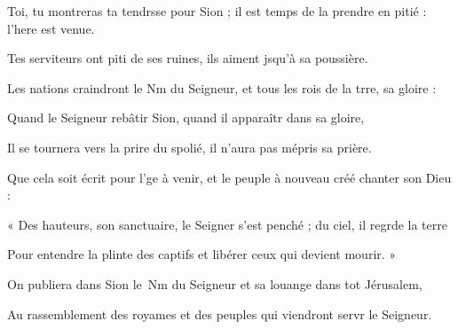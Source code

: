 \item Toi, tu montreras ta tendrsse pour Sion ;\psstar{} il est temps de la prendre en pitié : l’here est venue.
\item Tes serviteurs ont piti de ses ruines,\psstar{} ils aiment jsqu’à sa poussière.
\item Les nations craindront le Nm du Seigneur,\psstar{} et tous les rois de la trre, sa gloire :
\item Quand le Seigneur rebâtir Sion,\psstar{} quand il apparaîtr dans sa gloire,
\item Il se tournera vers la prire du spolié,\psstar{} il n’aura pas mépris sa prière.
\item Que cela soit écrit pour l’ge à venir,\psstar{} et le peuple à nouveau créé chanter son Dieu :
\item « Des hauteurs, son sanctuaire, le Seigner s’est penché ;\psstar{} du ciel, il regrde la terre
\item Pour entendre la plinte des captifs\psstar{} et libérer ceux qui devient mourir. »
\item On publiera dans Sion le Nm du Seigneur\psstar{} et sa louange dans tot Jérusalem,
\item Au rassemblement des royames et des peuples\psstar{} qui viendront servr le Seigneur.